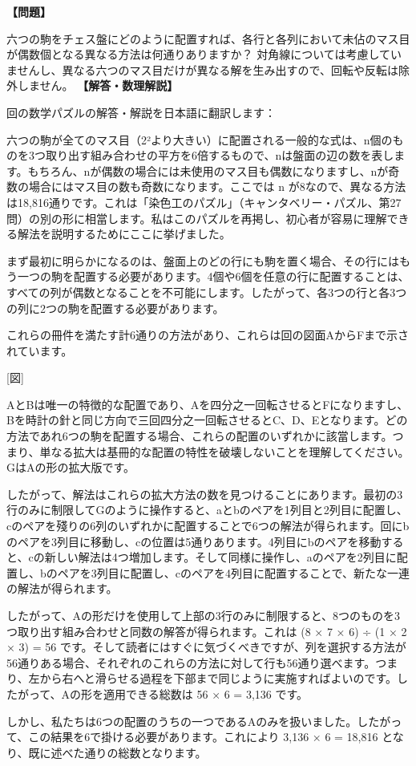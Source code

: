 \documentclass[10pt,a4paper,oneside,openany]{ltjsbook}
\begin{document}
\begin{tcolorbox}[colback=softblue,colframe=primaryblue,title=\textbf{第 358 問：THE SIX PAWNS.},arc=2mm,boxrule=1pt,breakable]
\textbf{【問題】}\par\vspace{0.3em}
六つの駒をチェス盤にどのように配置すれば、各行と各列において未佔のマス目が偶数個となる異なる方法は何通りありますか？
対角線については考慮していませんし、異なる六つのマス目だけが異なる解を生み出すので、回転や反転は除外しません。
\tcblower
\textbf{【解答・数理解説】}\par\vspace{0.3em}
回の数学パズルの解答・解説を日本語に翻訳します：

六つの駒が全てのマス目（2²より大きい）に配置される一般的な式は、n個のものを3つ取り出す組み合わせの平方を6倍するもので、nは盤面の辺の数を表します。もちろん、nが偶数の場合には未使用のマス目も偶数になりますし、nが奇数の場合にはマス目の数も奇数になります。ここでは n が8なので、異なる方法は18,816通りです。これは「染色工のパズル」（キャンタベリー・パズル、第27問）の別の形に相當します。私はこのパズルを再掲し、初心者が容易に理解できる解法を説明するためにここに挙げました。

まず最初に明らかになるのは、盤面上のどの行にも駒を置く場合、その行にはもう一つの駒を配置する必要があります。4個や6個を任意の行に配置することは、すべての列が偶数となることを不可能にします。したがって、各3つの行と各3つの列に2つの駒を配置する必要があります。

これらの冊件を満たす計6通りの方法があり、これらは回の図面AからFまで示されています。

[図]

AとBは唯一の特徴的な配置であり、Aを四分之一回転させるとFになりますし、Bを時計の針と同じ方向で三回四分之一回転させるとC、D、Eとなります。どの方法であれ6つの駒を配置する場合、これらの配置のいずれかに該當します。つまり、単なる拡大は基冊的な配置の特性を破壊しないことを理解してください。GはAの形の拡大版です。

したがって、解法はこれらの拡大方法の数を見つけることにあります。最初の3行のみに制限してGのように操作すると、aとbのペアを1列目と2列目に配置し、cのペアを殘りの6列のいずれかに配置することで6つの解法が得られます。回にbのペアを3列目に移動し、cの位置は5通りあります。4列目にbのペアを移動すると、cの新しい解法は4つ増加します。そして同様に操作し、aのペアを2列目に配置し、bのペアを3列目に配置し、cのペアを4列目に配置することで、新たな一連の解法が得られます。

したがって、Aの形だけを使用して上部の3行のみに制限すると、8つのものを3つ取り出す組み合わせと同数の解答が得られます。これは (8 × 7 × 6) ÷ (1 × 2 × 3) = 56 です。そして読者にはすぐに気づくべきですが、列を選択する方法が56通りある場合、それぞれのこれらの方法に対して行も56通り選べます。つまり、左から右へと滑らせる過程を下部まで同じように実施すればよいのです。したがって、Aの形を適用できる総数は 56 × 6 = 3,136 です。

しかし、私たちは6つの配置のうちの一つであるAのみを扱いました。したがって、この結果を6で掛ける必要があります。これにより 3,136 × 6 = 18,816 となり、既に述べた通りの総数となります。
\end{tcolorbox}
\end{document}
